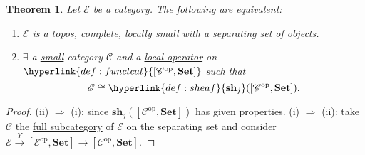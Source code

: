 \documentclass{article}
\newcommand{\setc}{\mathbf{Set}}
\newcommand{\sh}{\mathbf{sh}}
\newcommand{\cc}{\mathscr{C}}
\newcommand{\ec}{\mathscr{E}}
\let\to\longrightarrow
\newtheorem{nthm}{Theorem}[section]
\begin{document}
\begin{nthm}\label{thm:7.23}
  Let $\ec$ be a \hyperlink{def:cat}{category}. The following are equivalent:
  \begin{enumerate}[label=(\roman*)]
    \item $\ec$ is a \hyperlink{def:topos}{topos}, \hyperlink{def:complete}{complete}, \hyperlink{def:lsmall}{locally small} with a \hyperlink{def:separating}{separating set of objects}.
    \item $\exists$ a \hyperlink{def:small}{small} category $\cc$ and a \hyperlink{def:lop}{local operator} on $\hyperlink{def:functcat}{[\cc^{\text{op}}, \setc]}$ such that
      \begin{equation*}
        \ec \cong \hyperlink{def:sheaf}{\sh_j}([\cc^{\text{op}}, \setc]).
      \end{equation*}
  \end{enumerate}
\end{nthm}
\begin{proof}
  (ii) $\Rightarrow$ (i): since $\sh_j([\cc^{\text{op}}, \setc])$ has given properties.
  (i) $\Rightarrow$ (ii): take $\cc$ the \hyperlink{def:fulls}{full subcategory} of $\ec$ on the separating set and consider $\ec \overset{Y}\to [\ec^{\text{op}}, \setc] \to [\cc^{\text{op}}, \setc]$.
\end{proof}
\printindex
 
\end{document}
